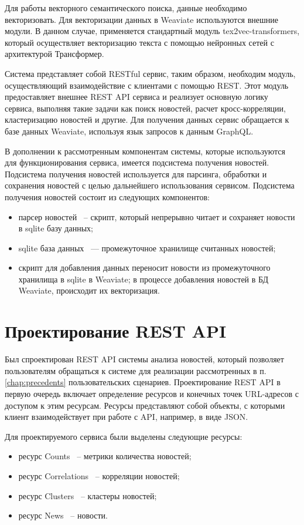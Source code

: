 Для работы векторного семантического поиска, данные необходимо векторизовать. Для векторизации данных в Weaviate используются внешние модули. В данном случае, применяется стандартный модуль tex2vec-transformers, который осуществляет векторизацию текста с помощью нейронных сетей с архитектурой Трансформер.

Система представляет собой RESTful сервис, таким образом, необходим модуль, осуществляющий взаимодействие с клиентами с помощью REST. Этот модуль предоставляет внешнее REST API сервиса и реализует основную логику сервиса, выполняя такие задачи как поиск новостей, расчет кросс-корреляции, кластеризацию новостей и другие. Для получения данных сервис обращается к базе данных Weaviate, используя язык запросов к данным GraphQL.

В дополнении к рассмотренным компонентам системы, которые используются для функционирования сервиса, имеется подсистема получения новостей. Подсистема получения новостей используется для парсинга, обработки и сохранения новостей с целью дальнейшего использования сервисом. Подсистема получения новостей состоит из следующих компонентов:
\begin{itemize}
    \item парсер новостей ~-- скрипт, который непрерывно читает и сохраняет новости в sqlite базу данных;
    \item sqlite база данных ~--- промежуточное хранилище считанных новостей;
    \item скрипт для добавления данных переносит новости из промежуточного хранилища в sqlite в Weaviate; в процессе добавления новостей в БД Weaviate, происходит их векторизация.
\end{itemize}

\section{Проектирование REST API}

Был спроектирован REST API системы анализа новостей, который позволяет пользователям обращаться к системе для реализации рассмотренных в п. \ref{chap:precedents} пользовательских сценариев. Проектирование REST API в первую очередь включает определение ресурсов и конечных точек URL-адресов с доступом к этим ресурсам. Ресурсы представляют собой объекты, с которыми клиент взаимодействует при работе с API, например, в виде JSON.

Для проектируемого сервиса были выделены следующие ресурсы:
\begin{itemize}
    \item ресурс Counts ~-- метрики количества новостей;
    \item ресурс Correlations ~-- корреляции новостей;
    \item ресурс Clusters ~-- кластеры новостей;
    \item ресурс News ~-- новости.
\end{itemize}

